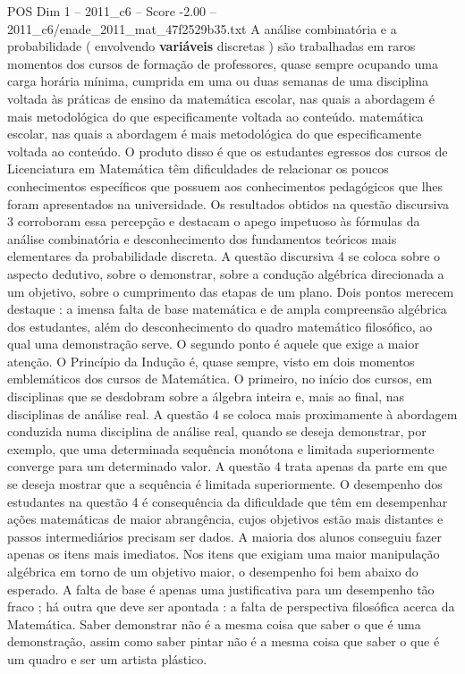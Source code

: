 \begin{textsample}{POS Dim 1 – 2011\_c6 – Score -2.00 – 2011\_c6/enade\_2011\_mat\_47f2529b35.txt}
A análise combinatória e a probabilidade ( envolvendo \textbf{variáveis} discretas ) são trabalhadas em raros momentos dos cursos de formação de professores, quase sempre ocupando uma carga horária mínima, cumprida em uma ou duas semanas de uma disciplina voltada às práticas de ensino da matemática escolar, nas quais a abordagem é mais metodológica do que especificamente voltada ao conteúdo. matemática escolar, nas quais a abordagem é mais metodológica do que especificamente voltada ao conteúdo.
O produto disso é que os estudantes egressos dos cursos de Licenciatura em Matemática têm dificuldades de relacionar os poucos conhecimentos específicos que possuem aos conhecimentos pedagógicos que lhes foram apresentados na universidade.
Os resultados obtidos na questão discursiva 3 corroboram essa percepção e destacam o apego impetuoso às fórmulas da análise combinatória e desconhecimento dos fundamentos teóricos mais elementares da probabilidade discreta.
A questão discursiva 4 se coloca sobre o aspecto dedutivo, sobre o demonstrar, sobre a condução algébrica direcionada a um objetivo, sobre o cumprimento das etapas de um plano.
Dois pontos merecem destaque : a imensa falta de base matemática e de ampla compreensão algébrica dos estudantes, além do desconhecimento do quadro matemático filosófico, ao qual uma demonstração serve.
O segundo ponto é aquele que exige a maior atenção.
O Princípio da Indução é, quase sempre, visto em dois momentos emblemáticos dos cursos de Matemática.
O primeiro, no início dos cursos, em disciplinas que se desdobram sobre a álgebra inteira e, mais ao final, nas disciplinas de análise real.
A questão 4 se coloca mais proximamente à abordagem conduzida numa disciplina de análise real, quando se deseja demonstrar, por exemplo, que uma determinada sequência monótona e limitada superiormente converge para um determinado valor.
A questão 4 trata apenas da parte em que se deseja mostrar que a sequência é limitada superiormente.
O desempenho dos estudantes na questão 4 é consequência da dificuldade que têm em desempenhar ações matemáticas de maior abrangência, cujos objetivos estão mais distantes e passos intermediários precisam ser dados.
A maioria dos alunos conseguiu fazer apenas os itens mais imediatos.
Nos itens que exigiam uma maior manipulação algébrica em torno de um objetivo maior, o desempenho foi bem abaixo do esperado.
A falta de base é apenas uma justificativa para um desempenho tão fraco ; há outra que deve ser apontada : a falta de perspectiva filosófica acerca da Matemática.
Saber demonstrar não é a mesma coisa que saber o que é uma demonstração, assim como saber pintar não é a mesma coisa que saber o que é um quadro e ser um artista plástico.

\end{textsample}
